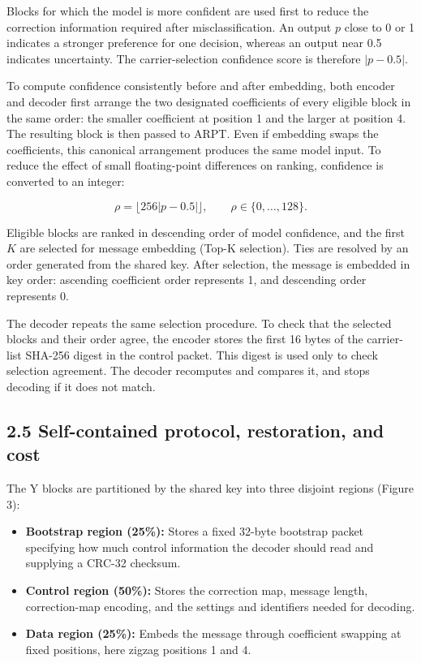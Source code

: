 \documentclass[
  11pt,
  a4paper,
]{article}
\providecommand{\tightlist}{%
  \setlength{\itemsep}{0pt}\setlength{\parskip}{0pt}}
\begin{document}
Blocks for which the model is more confident are used first to reduce
the correction information required after misclassification. An output
\(p\) close to 0 or 1 indicates a stronger preference for one decision,
whereas an output near 0.5 indicates uncertainty. The carrier-selection
confidence score is therefore \(|p-0.5|\).

To compute confidence consistently before and after embedding, both
encoder and decoder first arrange the two designated coefficients of
every eligible block in the same order: the smaller coefficient at
position 1 and the larger at position 4. The resulting block is then
passed to ARPT. Even if embedding swaps the coefficients, this canonical
arrangement produces the same model input. To reduce the effect of small
floating-point differences on ranking, confidence is converted to an
integer:

\[
\rho = \lfloor256|p-0.5|\rfloor, \qquad \rho \in \{0, \ldots, 128\}. \tag{10}
\]

Eligible blocks are ranked in descending order of model confidence, and
the first \(K\) are selected for message embedding (Top-K selection).
Ties are resolved by an order generated from the shared key. After
selection, the message is embedded in key order: ascending coefficient
order represents 1, and descending order represents 0.

The decoder repeats the same selection procedure. To check that the
selected blocks and their order agree, the encoder stores the first 16
bytes of the carrier-list SHA-256 digest in the control packet. This
digest is used only to check selection agreement. The decoder recomputes
and compares it, and stops decoding if it does not match.

\subsection*{2.5 Self-contained protocol, restoration, and
cost}\label{self-contained-protocol-restoration-and-cost}

The Y blocks are partitioned by the shared key into three disjoint
regions (Figure 3):

\begin{itemize}
\tightlist
\item
  \textbf{Bootstrap region (25\%):} Stores a fixed 32-byte bootstrap
  packet specifying how much control information the decoder should read
  and supplying a CRC-32 checksum.
\item
  \textbf{Control region (50\%):} Stores the correction map, message
  length, correction-map encoding, and the settings and identifiers
  needed for decoding.
\item
  \textbf{Data region (25\%):} Embeds the message through coefficient
  swapping at fixed positions, here zigzag positions 1 and 4.
\end{itemize}
\end{document}
